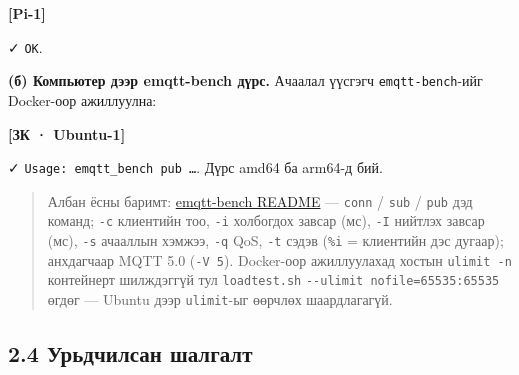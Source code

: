 \textbf{{[}Pi-1{]}}

\begin{Shaded}
\begin{Highlighting}[]
 
  
\end{Highlighting}
\end{Shaded}

✓ \texttt{OK}.

\textbf{(б) Компьютер дээр emqtt-bench дүрс.} Ачаалал үүсгэгч \texttt{emqtt-bench}-ийг Docker-оор ажиллуулна:

\textbf{{[}ЗК · Ubuntu-1{]}}

\begin{Shaded}
\begin{Highlighting}[]
\KeywordTok{|} 
\end{Highlighting}
\end{Shaded}

✓ \texttt{Usage:\allowbreak{}\ emqtt\_\allowbreak{}bench\ pub\ \ldots{}}. Дүрс amd64 ба arm64-д бий.

\begin{quote}
Албан ёсны баримт: \href{https://github.com/emqx/emqtt-bench}{emqtt-bench README} --- \texttt{conn} / \texttt{sub} / \texttt{pub} дэд команд; \texttt{-c} клиентийн тоо, \texttt{-i} холбогдох завсар (мс), \texttt{-I} нийтлэх завсар (мс), \texttt{-s} ачааллын хэмжээ, \texttt{-q} QoS, \texttt{-t} сэдэв (\texttt{\%i} = клиентийн дэс дугаар); анхдагчаар MQTT 5.0 (\texttt{-V\ 5}). Docker-оор ажиллуулахад хостын \texttt{ulimit\ -n} контейнерт шилждэггүй тул \texttt{loadtest.sh} \texttt{-\/\allowbreak{}-ulimit\ nofile=\allowbreak{}65535:\allowbreak{}65535} өгдөг --- Ubuntu дээр \texttt{ulimit}-ыг өөрчлөх шаардлагагүй.
\end{quote}

\hypertarget{ux443ux440ux44cux434ux447ux438ux43bux441ux430ux43d-ux448ux430ux43bux433ux430ux43bux442}{%
\subsection{2.4 Урьдчилсан шалгалт}\label{ux443ux440ux44cux434ux447ux438ux43bux441ux430ux43d-ux448ux430ux43bux433ux430ux43bux442}}

